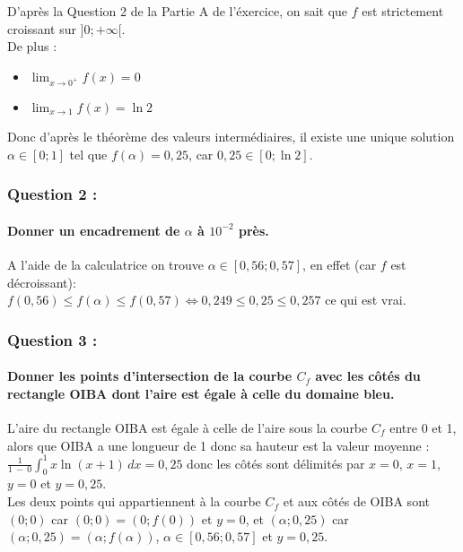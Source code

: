 \documentclass[a4paper, 12pt]{article}
\begin{document}
D'après la Question 2 de la Partie A de l'éxercice, on sait que $f$ est strictement croissant sur $]0;+\infty[$.
\\
De plus : 
\\
\begin{itemize}
    \item[\textbullet] $ \displaystyle \lim_{x \to 0^+}f(x)=0$ \\[1mm]
    \item[\textbullet] $ \displaystyle \lim_{x \to 1}f(x) = \ln{2} $ \\[1mm]
\end{itemize}
Donc d'après le théorème des valeurs intermédiaires, il existe une unique solution $\alpha \in [0;1]$ tel que $f(\alpha) = 0,25$, car $0,25 \in [0;\ln{2}]$.

{}
\subsubsection*{Question 2 :}
\paragraph*{Donner un encadrement de $\alpha$ à $10^{-2}$ près.\\[5mm]}

A l'aide de la calculatrice on trouve $\alpha \in [0,56;0,57]$, en effet (car $f$ est décroissant): 
\\
$f(0,56) \leq f(\alpha) \leq f(0,57) \iff 0,249 \leq 0,25 \leq 0,257$ ce qui est vrai.

{}
\subsubsection*{Question 3 :}
\paragraph*{Donner les points d'intersection de la courbe $C_f$ avec les côtés du rectangle OIBA dont l'aire est égale à celle du domaine bleu.\\[5mm]}

L'aire du rectangle OIBA est égale à celle de l'aire sous la courbe $C_f$ entre 0 et 1, alors que OIBA a une longueur de 1 donc sa hauteur est la valeur moyenne :
\\
$\frac{1}{1\ -\ 0}\displaystyle \int_0^1 x\ln{\left(x+1\right)} \,dx = 0,25$ donc les côtés sont délimités par $x=0$, $x=1$, $y=0$ et $y=0,25$.
\\ 
Les deux points qui appartiennent à la courbe $C_f$ et aux côtés de OIBA sont $(0;0)$ car $(0;0) = (0;f(0))$ et $y=0$, 
et $(\alpha;0,25)$ car $(\alpha;0,25) = (\alpha;f(\alpha))$, $\alpha \in[0,56;0,57]$ et $y=0,25$.
\end{document}
